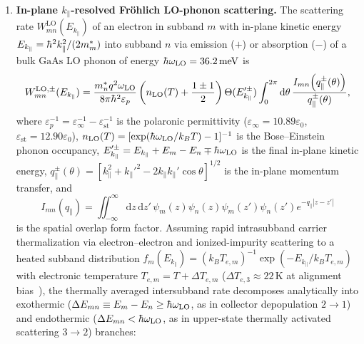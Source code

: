 \documentclass[11pt,letterpaper]{article}
\renewcommand{\hbar}{\mathchar'26\mkern-9mu h}
\begin{document}
\begin{enumerate}
    \item \textbf{In-plane $k_\parallel$-resolved Fr\"ohlich LO-phonon scattering.} The scattering rate $W_{mn}^{\mathrm{LO}}(E_{k_\parallel})$ of an electron in subband $m$ with in-plane kinetic energy $E_{k_\parallel} = \hbar^2 k_\parallel^2/(2m_m^*)$ into subband $n$ via emission ($+$) or absorption ($-$) of a bulk $\mathrm{GaAs}$ LO phonon of energy $\hbar\omega_{\mathrm{LO}} = 36.2\,\mathrm{meV}$ is~\cite{Ferreira1989,Jirauschek2014,Vurgaftman2021}
    \begin{equation}
    W_{mn}^{\mathrm{LO},\pm}(E_{k_\parallel}) = \frac{m_n^* q^2 \omega_{\mathrm{LO}}}{8\pi \hbar^2 \varepsilon_p}\left(n_{\mathrm{LO}}(T) + \frac{1 \pm 1}{2}\right)\Theta(E_{k_\parallel}'^{\pm}) \int_0^{2\pi} \mathrm{d}\theta\,\frac{I_{mn}\!\left(q_\parallel^{\pm}(\theta)\right)}{q_\parallel^{\pm}(\theta)},
    \label{eq:frohlich_rate}
    \end{equation}
    where $\varepsilon_p^{-1} = \varepsilon_\infty^{-1} - \varepsilon_{\mathrm{st}}^{-1}$ is the polaronic permittivity ($\varepsilon_\infty = 10.89\varepsilon_0$, $\varepsilon_{\mathrm{st}} = 12.90\varepsilon_0$), $n_{\mathrm{LO}}(T) = [\exp(\hbar\omega_{\mathrm{LO}}/k_B T) - 1]^{-1}$ is the Bose--Einstein phonon occupancy, $E_{k_\parallel}'^{\pm} = E_{k_\parallel} + E_m - E_n \mp \hbar\omega_{\mathrm{LO}}$ is the final in-plane kinetic energy, $q_\parallel^{\pm}(\theta) = [k_\parallel^2 + k_\parallel'^{2} - 2 k_\parallel k_\parallel' \cos\theta]^{1/2}$ is the in-plane momentum transfer, and
    \begin{equation}
    I_{mn}(q_\parallel) = \iint_{-\infty}^{\infty} \mathrm{d}z\,\mathrm{d}z'\,\psi_m(z)\psi_n(z)\psi_m(z')\psi_n(z') e^{-q_\parallel |z - z'|}
    \label{eq:form_factor}
    \end{equation}
    is the spatial overlap form factor. Assuming rapid intrasubband carrier thermalization via electron--electron and ionized-impurity scattering to a heated subband distribution $f_m(E_{k_\parallel}) = (k_B T_{e,m})^{-1}\exp(-E_{k_\parallel}/k_B T_{e,m})$ with electronic temperature $T_{e,m} = T + \Delta T_{e,m}$ ($\Delta T_{e,3} \approx 22\,\mathrm{K}$ at alignment bias~\cite{Vitiello2015,Jirauschek2014}), the thermally averaged intersubband rate decomposes analytically into exothermic ($\Delta E_{mn} \equiv E_m - E_n \ge \hbar\omega_{\mathrm{LO}}$, as in collector depopulation $2 \to 1$) and endothermic ($\Delta E_{mn} < \hbar\omega_{\mathrm{LO}}$, as in upper-state thermally activated scattering $3 \to 2$) branches:
    \begin{equation}

\end{equation}
\end{enumerate}
\end{document}
